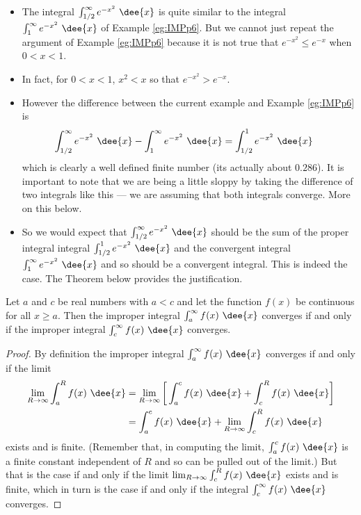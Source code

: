 \begin{eg}\label{eg:IMPp7}
\soln
\begin{itemize}
 \item The integral $\int_{1/2}^\infty e^{-x^2}\ \dee{x}$
is quite similar to the integral $\int_1^\infty e^{-x^2}\ \dee{x}$
of Example \ref{eg:IMPp6}. But we cannot just repeat the argument
of Example \ref{eg:IMPp6} because it is not true that
$e^{-x^2}\le e^{-x}$ when $0<x<1$.
\item In fact, for $0<x<1$, $x^2<x$ so that $e^{-x^2}>e^{-x}$.

\item However the difference between the current example and Example
\ref{eg:IMPp6} is
\begin{align*}
  \int_{1/2}^\infty e^{-x^2}\ \dee{x}-\int_1^\infty e^{-x^2}\ \dee{x}
  &= \int_{1/2}^1 e^{-x^2}\ \dee{x}
\end{align*}
which is clearly a well defined finite number (its actually about $0.286$).
It is important to note that we are being a little sloppy by taking the
difference of two integrals like this --- we are assuming that both integrals
converge.  More on this below.

\item So we would expect that $\int_{1/2}^\infty e^{-x^2}\ \dee{x}$
should be the sum of the proper integral integral $\int_{1/2}^1 e^{-x^2}\ \dee{x}$
and the convergent integral  $\int_1^\infty e^{-x^2}\ \dee{x}$
and so should be a convergent integral. This is indeed the case.
The Theorem below provides the justification.
\end{itemize}
\end{eg}

\begin{theorem}\label{thm:IMPfiniteSHift}
Let $a$ and $c$ be real numbers with $a<c$ and let the function $f(x)$ be
continuous for all $x\ge a$. Then the improper integral $\int_a^\infty f(x)\
\dee{x}$ converges if and only if the improper integral $\int_c^\infty f(x)\
\dee{x}$ converges.
\end{theorem}
\begin{proof}
By definition the improper integral $\int_a^\infty f(x)\ \dee{x}$ converges
if and only if the limit
\begin{align*}
\lim_{R\rightarrow\infty}\int_a^R f(x)\ \dee{x}
&=\lim_{R\rightarrow\infty}\bigg[\int_a^c f(x)\ \dee{x} +\int_c^R f(x)\ \dee{x}\bigg]\\
&=\int_a^c f(x)\ \dee{x} + \lim_{R\rightarrow\infty}\int_c^R f(x)\ \dee{x}
\end{align*}
exists and is finite. (Remember that, in computing the limit,
$\int_a^c f(x)\ \dee{x}$ is a finite constant independent of $R$ and so can
be pulled out of the limit.) But that is the case if and
only if the limit $\lim_{R\rightarrow\infty}\int_c^R f(x)\ \dee{x}$
exists and is finite, which in turn is the case if and only if the integral
$\int_c^\infty f(x)\ \dee{x}$ converges.
\end{proof}

